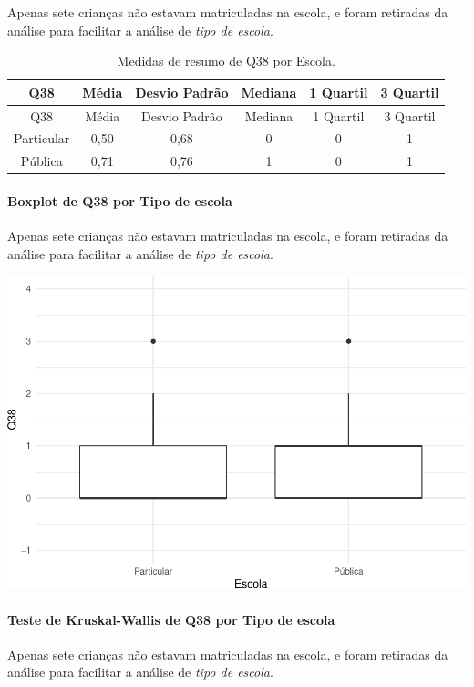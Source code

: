 \documentclass[]{article}
\let\oldparagraph\paragraph
\renewcommand{\paragraph}[1]{\oldparagraph{#1}\mbox{}}
\begin{document}
Apenas sete crianças não estavam matriculadas na escola, e foram retiradas da análise para facilitar a análise de \emph{tipo de escola}.

\begin{longtable}[]{@{}cccccc@{}}
\caption{\label{tab:unnamed-chunk-1472}Medidas de resumo de Q38 por Escola.}\tabularnewline
\toprule
Q38 & Média & Desvio Padrão & Mediana & 1 Quartil & 3 Quartil\tabularnewline
\midrule
\endfirsthead
\toprule
Q38 & Média & Desvio Padrão & Mediana & 1 Quartil & 3 Quartil\tabularnewline
\midrule
\endhead
Particular & 0,50 & 0,68 & 0 & 0 & 1\tabularnewline
Pública & 0,71 & 0,76 & 1 & 0 & 1\tabularnewline
\bottomrule
\end{longtable}

\hypertarget{boxplot-de-q38-por-tipo-de-escola}{%
\paragraph{Boxplot de Q38 por Tipo de escola}\label{boxplot-de-q38-por-tipo-de-escola}}

Apenas sete crianças não estavam matriculadas na escola, e foram retiradas da análise para facilitar a análise de \emph{tipo de escola}.

\begin{center}\includegraphics[width=0.75\linewidth]{relatorio_covid19_files/figure-latex/unnamed-chunk-1473-1} \end{center}

\hypertarget{teste-de-kruskal-wallis-de-q38-por-tipo-de-escola}{%
\paragraph{Teste de Kruskal-Wallis de Q38 por Tipo de escola}\label{teste-de-kruskal-wallis-de-q38-por-tipo-de-escola}}

Apenas sete crianças não estavam matriculadas na escola, e foram retiradas da análise para facilitar a análise de \emph{tipo de escola}.
\end{document}

